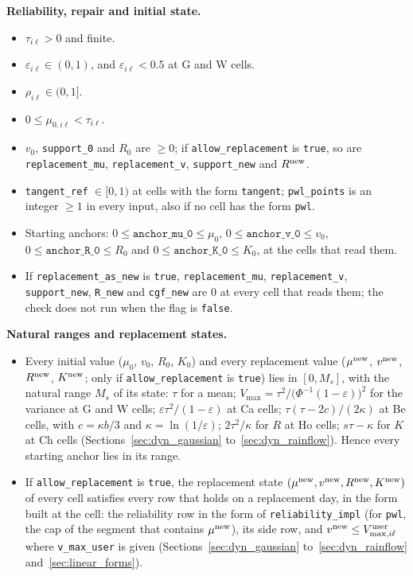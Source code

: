 \textbf{Reliability, repair and initial state.}
\begin{itemize}[leftmargin=1.5em]
  \item $\tau_{i\ell} > 0$ and finite.
  \item $\varepsilon_{i\ell} \in (0, 1)$, and $\varepsilon_{i\ell} < 0.5$ at G and W cells.
  \item $\rho_{i\ell} \in (0, 1]$.
  \item $0 \le \mu_{0,i\ell} < \tau_{i\ell}$.
  \item $v_0$, \texttt{support\_0} and $R_0$ are $\ge 0$; if \texttt{allow\_replacement} is \texttt{true}, so are \texttt{replacement\_mu}, \texttt{replacement\_v}, \texttt{support\_new} and $R^{\mathrm{new}}$.
  \item \texttt{tangent\_ref} $\in [0, 1)$ at cells with the form \texttt{tangent}; \texttt{pwl\_points} is an integer $\ge 1$ in every input, also if no cell has the form \texttt{pwl}.
  \item Starting anchors: $0 \le \texttt{anchor\_mu\_0} \le \mu_0$, $0 \le \texttt{anchor\_v\_0} \le v_0$, $0 \le \texttt{anchor\_R\_0} \le R_0$ and $0 \le \texttt{anchor\_K\_0} \le K_0$, at the cells that read them.
  \item If \texttt{replacement\_as\_new} is \texttt{true}, \texttt{replacement\_mu}, \texttt{replacement\_v}, \texttt{support\_new}, \texttt{R\_new} and \texttt{cgf\_new} are $0$ at every cell that reads them; the check does not run when the flag is \texttt{false}.
\end{itemize}

\textbf{Natural ranges and replacement states.}
\begin{itemize}[leftmargin=1.5em]
  \item Every initial value ($\mu_0$, $v_0$, $R_0$, $K_0$) and every replacement value ($\mu^{\mathrm{new}}$, $v^{\mathrm{new}}$, $R^{\mathrm{new}}$, $K^{\mathrm{new}}$; only if \texttt{allow\_replacement} is \texttt{true}) lies in $[0, M_s]$, with the natural range $M_s$ of its state: $\tau$ for a mean; $V_{\max} = \tau^2/\bigl(\Phi^{-1}(1-\varepsilon)\bigr)^2$ for the variance at G and W cells; $\varepsilon\tau^2/(1-\varepsilon)$ at Ca cells; $\tau(\tau - 2c)/(2\kappa)$ at Be cells, with $c = \kappa b/3$ and $\kappa = \ln(1/\varepsilon)$; $2\tau^2/\kappa$ for $R$ at Ho cells; $s\tau - \kappa$ for $K$ at Ch cells (Sections~\ref{sec:dyn_gaussian} to~\ref{sec:dyn_rainflow}). Hence every starting anchor lies in its range.
  \item If \texttt{allow\_replacement} is \texttt{true}, the replacement state $(\mu^{\mathrm{new}}, v^{\mathrm{new}}, R^{\mathrm{new}}, K^{\mathrm{new}})$ of every cell satisfies every row that holds on a replacement day, in the form built at the cell: the reliability row in the form of \texttt{reliability\_impl} (for \texttt{pwl}, the cap of the segment that contains $\mu^{\mathrm{new}}$), its side row, and $v^{\mathrm{new}} \le V^{\mathrm{user}}_{\max,i\ell}$ where \texttt{v\_max\_user} is given (Sections~\ref{sec:dyn_gaussian} to~\ref{sec:dyn_rainflow} and~\ref{sec:linear_forms}).
\end{itemize}

